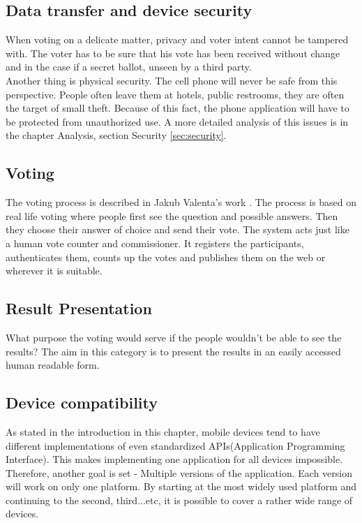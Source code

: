 \documentclass[11pt,twoside,a4paper]{book}
\begin{document}
\subsection{Data transfer and device security}
When voting on a delicate matter, privacy and voter intent cannot be tampered with. The voter has to be sure that his vote has been received without change and in the case if a secret ballot, unseen by a third party. \\
Another thing is physical security. The cell phone will never be safe from this perspective. People often leave them at hotels, public restrooms, they are often the target of small theft. Because of this fact, the phone application will have to be protected from unauthorized use. A more detailed analysis of this issues is in the chapter Analysis, section Security \ref{sec:security}.   \\
\subsection{Voting}
The voting process is described in Jakub Valenta's work \cite{bakalarkaJV} . The process is based on real life voting where people first see the question and possible answers. Then they choose their answer of choice and send their vote. The system acts just like a human vote counter and commissioner. It registers the participants, authenticates them, counts up the votes and publishes them on the web or wherever it is suitable.
\subsection{Result Presentation}
What purpose the voting would serve if the people wouldn't be able to see the results? The aim in this category is to present the results in an easily accessed human readable form.
\subsection{Device compatibility}
As stated in the introduction in this chapter, mobile devices tend to have different implementations of even standardized APIs(Application Programming Interface). This makes implementing one application for all devices impossible. Therefore, another goal is set - Multiple versions of the application.	 Each version will work on only one platform. By starting at the most widely used platform and continuing to the second, third...etc, it is possible to cover a rather wide range of devices.
\end{document}
